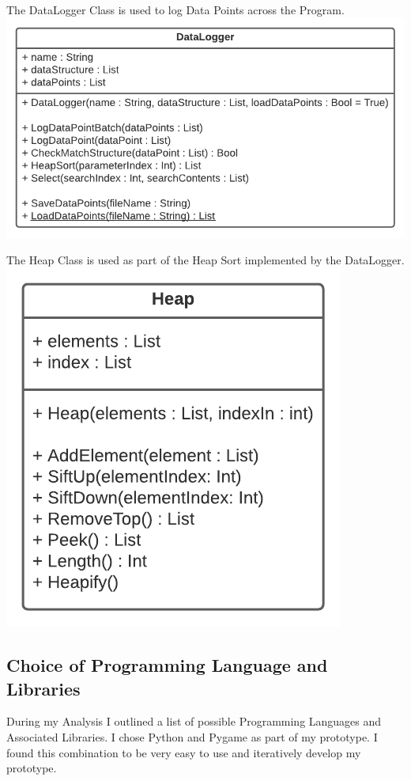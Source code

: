 \begin{flushleft}
\begin{center}
                The DataLogger Class is used to log Data Points across the Program. \\
                \includegraphics[width=.75\textwidth]{Images/Design/Classes/DataLogger.png} \\
                \vspace{0.2cm}

                The Heap Class is used as part of the Heap Sort implemented by the DataLogger. \\
                \includegraphics[width=.45\textwidth]{Images/Design/Classes/Heap.png} \\
                \vspace{0.2cm}
            \end{center}
            


        \subsection{Choice of Programming Language and Libraries}
            \large
            \vspace{0.2cm}  
            During my Analysis I outlined a list of possible Programming Languages and Associated Libraries. I chose Python
            and Pygame as part of my prototype. I found this combination to be very easy to use and iteratively develop my prototype. \\


\end{flushleft}
